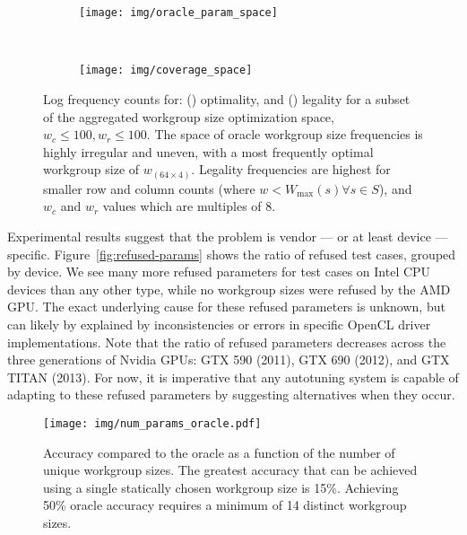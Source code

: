   \begin{figure}
    \centering
    \begin{subfigure}[t]{0.45\textwidth}
      \centering
      \texttt{[image: img/oracle\_param\_space]}
      \vspace{-1.5em} %
      \caption{}
      \label{fig:oracle-param-space}
    \end{subfigure}
    ~%
    \begin{subfigure}[t]{0.45\textwidth}
      \centering
      \texttt{[image: img/coverage\_space]}
      \vspace{-1.5em} %
      \caption{}
      \label{fig:coverage}
    \end{subfigure}
    \vspace{-.5em}
    \caption{%
    Log frequency counts for: ()
    optimality, and () legality for a subset of
    the aggregated workgroup size optimization space,
    $w_c \le 100, w_r \le 100$. The space of oracle workgroup size
    frequencies is highly irregular and uneven, with a most frequently
    optimal workgroup size of $w_{(64 \times 4)}$. Legality
    frequencies are highest for smaller row and column counts (where
    $w < W_{\max}(s) \forall s \in S$), and $w_c$ and $w_r$ values
    which are multiples of 8.%
    }
    \label{fig:oracle-wgsizes}
  \end{figure}

  Experimental results suggest that the problem is vendor --- or at
  least device --- specific. Figure~\ref{fig:refused-params} shows the
  ratio of refused test cases, grouped by device. We see many more
  refused parameters for test cases on Intel CPU devices than any other
  type, while no workgroup sizes were refused by the AMD GPU. The exact
  underlying cause for these refused parameters is unknown, but can
  likely by explained by inconsistencies or errors in specific OpenCL
  driver implementations. Note that the ratio of refused parameters
  decreases across the three generations of Nvidia GPUs: GTX 590 (2011),
  GTX 690 (2012), and GTX TITAN (2013). For now, it is imperative that
  any autotuning system is capable of adapting to these refused
  parameters by suggesting alternatives when they occur.

  \begin{figure}
    \centering
    \texttt{[image: img/num\_params\_oracle.pdf]}
    \caption{%
    Accuracy compared to the oracle as a function of the number of
    unique workgroup sizes. The greatest accuracy that can be achieved
    using a single statically chosen workgroup size is 15\%. Achieving
    50\% oracle accuracy requires a minimum of 14 distinct workgroup
    sizes.%
    }
    \label{fig:oracle-accuracy}
  \end{figure}

